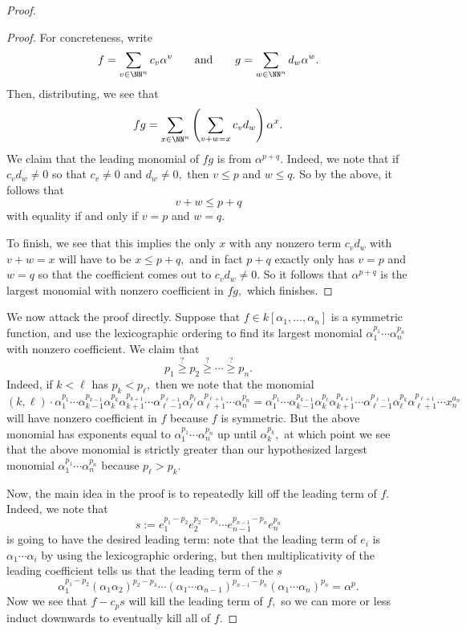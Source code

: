 \documentclass[../notes.tex]{subfiles}
\begin{document}
\begin{proof}
\begin{proof}
		For concreteness, write
		\[f=\sum_{v\in \NN^n}c_v\alpha^v\qquad\text{and}\qquad g=\sum_{w\in\NN^n}d_w\alpha^w.\]
		Then, distributing, we see that
		\[fg=\sum_{x\in\NN^n}\left(\sum_{v+w=x}c_vd_w\right)\alpha^x.\]
		We claim that the leading monomial of $fg$ is from $\alpha^{p+q}.$ Indeed, we note that if $c_vd_w\ne0$ so that $c_v\ne0$ and $d_w\ne0,$ then $v\le p$ and $w\le q.$ So by the above, it follows that
		\[v+w\le p+q\]
		with equality if and only if $v=p$ and $w=q.$

		To finish, we see that this implies the only $x$ with any nonzero term $c_vd_w$ with $v+w=x$ will have to be $x\le p+q,$ and in fact $p+q$ exactly only has $v=p$ and $w=q$ so that the coefficient comes out to $c_vd_w\ne0.$ So it follows that $\alpha^{p+q}$ is the largest monomial with nonzero coefficient in $fg,$ which finishes.
	\end{proof}

	We now attack the proof directly. Suppose that $f\in k[\alpha_1,\ldots,\alpha_n]$ is a symmetric function, and use the lexicographic ordering to find its largest monomial $\alpha_1^{p_1}\cdots \alpha_n^{p_n}$ with nonzero coefficient. We claim that
	\[p_1\stackrel?\ge p_2\stackrel?\ge\cdots\stackrel?\ge p_n.\]
	Indeed, if $k<\ell$ has $p_k<p_\ell,$ then we note that the monomial
	\[(k,\ell)\cdot \alpha_1^{p_1}\cdots \alpha_{k-1}^{p_{k-1}}\alpha_k^{p_k}\alpha_{k+1}^{p_{k+1}}\cdots \alpha_{\ell-1}^{p_{\ell-1}}\alpha_\ell^{p_\ell}\alpha_{\ell+1}^{p_{\ell+1}} \cdots \alpha_n^{p_n}=\alpha_1^{p_1}\cdots \alpha_{k-1}^{p_{k-1}}\alpha_k^{p_\ell}\alpha_{k+1}^{p_{k+1}}\cdots \alpha_{\ell-1}^{p_{\ell-1}}\alpha_\ell^{p_k}\alpha_{\ell+1}^{p_{\ell+1}} \cdots x_n^{a_n}\]
	will have nonzero coefficient in $f$ because $f$ is symmetric. But the above monomial has exponents equal to $\alpha_1^{p_1}\cdots\alpha_n^{p_n}$ up until $\alpha_k^{p_k},$ at which point we see that the above monomial is strictly greater than our hypothesized largest monomial $\alpha_1^{p_1}\cdots \alpha_n^{p_n}$ because $p_\ell>p_k.$

	Now, the main idea in the proof is to repeatedly kill off the leading term of $f.$ Indeed, we note that
	\[s:=e_1^{p_1-p_2}e_2^{p_2-p_3}\cdots e_{n-1}^{p_{n-1}-p_n}e_n^{p_n}\]
	is going to have the desired leading term: note that the leading term of $e_i$ is $\alpha_1\cdots\alpha_i$ by using the lexicographic ordering, but then multiplicativity of the leading coefficient tells us that the leading term of the $s$
	\[\alpha_1^{p_1-p_2}(\alpha_1\alpha_2)^{p_2-p_3}\cdots(\alpha_1\cdots\alpha_{n-1})^{p_{n-1}-p_n}(\alpha_1\cdots\alpha_n)^{p_n}=\alpha^p.\]
	Now we see that $f-c_ps$ will kill the leading term of $f,$ so we can more or less induct downwards to eventually kill all of $f.$


\end{proof}
\end{document}
